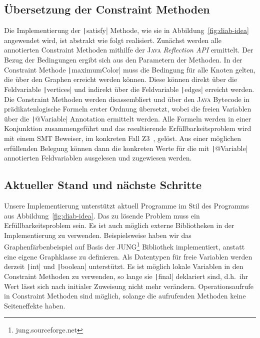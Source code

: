 \documentclass[a4paper,fontsize=12pt,headings=small,captions=tableheading,%
numbers=endperiod,abstracton,pdftex]{scrartcl}
\begin{document}
\subsection{Übersetzung der Constraint Methoden}
Die Implementierung der \texttt|satisfy| Methode, wie sie in
Abbildung~\ref{fig:diab-idea} angewendet wird, ist abstrakt wie folgt
realisiert.  Zunächst werden alle annotierten Constraint Methoden mithilfe der
\textsc{Java} \emph{Reflection API} ermittelt.  Der Bezug der Bedingungen ergibt
sich aus den Parametern der Methoden.  In der Constraint Methode
\texttt|maximumColor| muss die Bedingung für alle Knoten gelten, die
über den Graphen erreicht werden können.  Diese können direkt über die
Feldvariable \texttt|vertices| und indirekt über die Feldvariable
\texttt|edges| erreicht werden.  Die Constraint Methoden werden
disassembliert und über den \textsc{Java} Bytecode in prädikatenlogische Formeln
erster Ordnung übersetzt, wobei die freien Variablen über die
\texttt|@Variable| Annotation ermittelt werden.  Alle Formeln werden
in einer Konjunktion zusammengeführt und das resultierende Erfüllbarkeitsproblem
wird mit einem SMT Beweiser, im konkreten Fall Z3~\cite{MB:08}, gelöst.  Aus
einer möglichen erfüllenden Belegung können dann die konkreten Werte für die mit
\texttt|@Variable| annotierten Feldvariablen ausgelesen und zugewiesen
werden.

\subsection{Aktueller Stand und nächste Schritte}
Unsere Implementierung unterstützt aktuell Programme im Stil des Programms aus
Abbildung~\ref{fig:diab-idea}.  Das zu lösende Problem muss ein
Erfüllbarkeitsproblem sein.  Es ist auch möglich externe Bibliotheken in der
Implementierung zu verwenden.  Beispielsweise haben wir das
Graphenfärbenbeispiel auf Basis der JUNG\footnote{jung.sourceforge.net}
Bibliothek implementiert, anstatt eine eigene Graphklasse zu definieren.  Als
Datentypen für freie Variablen werden derzeit \texttt|int| und
\texttt|boolean| unterstützt.  Es ist möglich lokale Variablen in den
Constraint Methoden zu verwenden, so lange sie \texttt|final|
deklariert sind, d.h.~ihr Wert lässt sich nach initialer Zuweisung nicht mehr
verändern.  Operationsaufrufe in Constraint Methoden sind möglich, solange die
aufrufenden Methoden keine Seiteneffekte haben.
\end{document}
